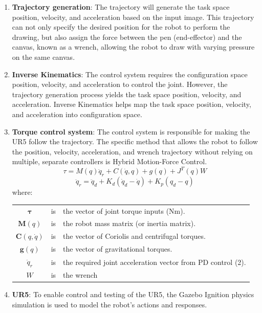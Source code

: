\documentclass[10pt]{article}
\begin{document}
\begin{enumerate}[itemsep=-2pt]
    \item \textbf{Trajectory generation}: 
    The trajectory will generate the task space position, velocity, and acceleration based on the input image. This trajectory can not only specify the desired position for the robot to perform the drawing, but also assign the force between the pen (end-effector) and the canvas, known as a wrench, allowing the robot to draw with varying pressure on the same canvas. 
    \item \textbf{Inverse Kinematics}: 
    The control system requires the configuration space position, velocity, and acceleration to control the joint. However, the trajectory generation process yields the task space position, velocity, and acceleration. Inverse Kinematics helps map the task space position, velocity, and acceleration into configuration space.
    \item \textbf{Torque control system}:
    The control system is responsible for making the UR5 follow the trajectory. The specific method that allows the robot to follow the position, velocity, acceleration, and wrench trajectory without relying on multiple, separate controllers is Hybrid Motion-Force Control.
    \begin{equation}
       \tau = M(q)\ddot{q}_r + C(\dot{q}, q) + g(q) + J^T(q)W
    \end{equation}
    \begin{equation}
        \ddot{q}_r = \ddot{q}_d + K_d(\dot{q}_d - \dot{q}) + K_p (q_d - q)
    \end{equation}
    \vspace{-10pt}
    where:
    \begin{center}
    \begin{tabular}{c c p{10cm}}
        $\mathbf{\tau}$ & is & the vector of joint torque inputs (Nm). \\
        $\mathbf{M}(q)$ & is & the robot mass matrix (or inertia matrix). \\
        $\mathbf{C}(q, \dot{q})$ & is & the vector of Coriolis and centrifugal torques. \\
        $\mathbf{g}(q)$ & is & the vector of gravitational torques. \\
        $\ddot{q}_r$ & is & the required joint acceleration vector from PD control (2). \\
        $W$ & is & the wrench
    \end{tabular}
    \end{center}
    
    \item \textbf{UR5}: 
    To enable control and testing of the UR5, the Gazebo Ignition physics simulation is used to model the robot's actions and responses.
\end{enumerate}
\end{document}
